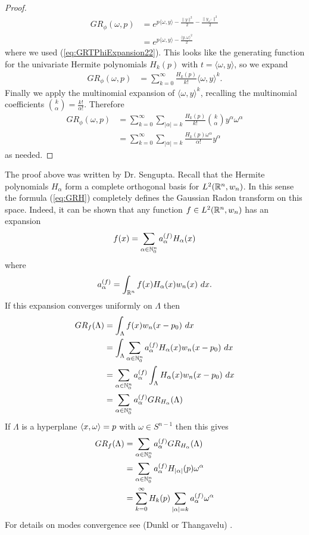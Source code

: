 \begin{proof}
  \begin{align*}
    GR_{\phi}(\omega, p) 
      &= e^{p \langle \omega, y\rangle - \frac{\|y\|^2}2-\frac{\|y_{\omega^\perp}\|^2}2}
    \\
      &= e^{p \langle \omega, y\rangle - \frac{\langle y, \omega\rangle^2}2}
  \end{align*}
  where we used (\ref{eq:GRTPhiExpansion22}). This looks like the generating function for the univariate Hermite polynomials $H_k(p)$ with $t = \langle \omega, y \rangle$, so we expand
  \begin{align*}
    GR_{\phi}(\omega, p) 
      &= \sum_{k = 0}^\infty \frac{H_k(p)}{k!} \langle \omega, y\rangle^k.
  \end{align*}
  Finally we apply the multinomial expansion of $\langle \omega, y\rangle^k$, recalling the multinomial coefficients $\binom{k}{\alpha} = \frac{k!}{\alpha!}$. Therefore
  \begin{align*}
    GR_{\phi}(\omega, p)
      &= \sum_{k = 0}^\infty \sum_{|\alpha| = k} \frac{H_k(p)}{k!} \binom{k}\alpha y^\alpha\omega^\alpha
    \\
      &= \sum_{k = 0}^\infty \sum_{|\alpha| = k} \frac{H_k(p)\omega^\alpha}{\alpha!} y^\alpha
  \end{align*}
  as needed.
\end{proof}

\begin{remark}
  The proof above was written by Dr. Sengupta. Recall that the Hermite polynomials $H_\alpha$ form a complete orthogonal basis for $L^2(\mathbb{R}^n, w_n)$. In this sense the formula (\ref{eq:GRH}) completely defines the Gaussian Radon transform on this space. Indeed, it can be shown that any function $f \in L^2(\mathbb{R}^n, w_n)$ has an expansion
  \[
    f(x) = \sum_{\alpha \in \mathbb{N}_0^n} a^{(f)}_\alpha H_\alpha(x)
  \]
  where
  \[
    a_\alpha^{(f)} = \int_{\mathbb{R}^n} f(x)H_\alpha(x) w_n(x) ~dx.
  \]
  If this expansion converges uniformly on $\Lambda$ then
  \begin{align*}
    GR_f(\Lambda) 
    &= \int_\Lambda f(x) w_n(x-p_0)~dx 
    \\ 
    &= \int_\Lambda \sum_{\alpha \in \mathbb{N}_0^n} a_\alpha^{(f)} H_\alpha(x) w_n(x-p_0) ~dx
    \\
    &= \sum_{\alpha \in \mathbb{N}_0^n} a_\alpha^{(f)} \int_\Lambda H_\alpha(x) w_n(x-p_0) ~dx
    \\
    &= \sum_{\alpha \in \mathbb{N}_0^n} a_\alpha^{(f)} GR_{H_\alpha}(\Lambda)
  \end{align*}
  If $\Lambda$ is a hyperplane $\left\langle x, \omega \right\rangle = p$ with $\omega \in S^{n-1}$ then this gives
  \begin{align*}
    GR_f(\Lambda) 
    &= \sum_{\alpha \in \mathbb{N}_0^n} a_\alpha^{(f)} GR_{H_\alpha}(\Lambda)
    \\
    &= \sum_{\alpha \in \mathbb{N}_0^n} a_\alpha^{(f)} H_{|\alpha|}(p) \omega^\alpha
    \\
    &= \sum_{k=0}^\infty H_k(p) \sum_{|\alpha| = k} a_\alpha^{(f)} \omega^\alpha
  \end{align*}
  For details on modes convergence see (Dunkl or Thangavelu) \cn. 
\end{remark}

